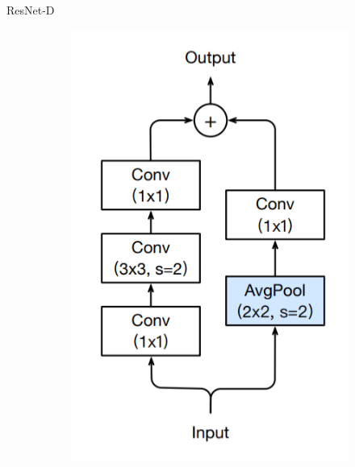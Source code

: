 \begin{frame}{ResNet-D}
\begin{figure}[H]
\begin{subfigure}[b]{0.25\textwidth}
        \includegraphics[width=\textwidth]{img/01-resnet_d.png}
        \label{fig:skip2}
    \end{subfigure}
    \label{fig:resnet_compare}
\end{figure}
\end{frame}

